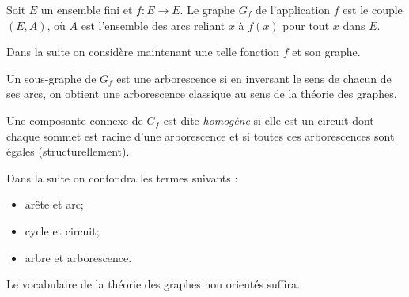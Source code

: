 \begin{definition}
Soit $E$ un ensemble fini et $f:E\rightarrow E$. Le graphe $G_f$ de l'application $f$ est le couple $(E, A)$, o\`u $A$ est l'ensemble des arcs reliant $x$ \`a $f(x)$ pour tout $x$ dans $E$.
\end{definition}

Dans la suite on consid\`ere maintenant une telle fonction $f$ et son graphe.

\begin{definition}[arborescence]
Un sous-graphe de $G_f$ est une arborescence si en inversant le sens de chacun de ses arcs, on obtient une arborescence classique au sens de la th\'eorie des graphes.
\end{definition}

\begin{definition}
Une composante connexe de $G_f$ est dite \emph{homog\`ene} si elle est un circuit dont chaque sommet est racine d'une arborescence et si toutes ces arborescences sont \'egales (structurellement).
\end{definition}

\begin{rem}
Dans la suite on confondra les termes suivants :
\begin{itemize}
\item ar\^ete et arc;
\item cycle et circuit;
\item arbre et arborescence.
\end{itemize}
Le vocabulaire de la th\'eorie des graphes non orient\'es suffira.
\end{rem}